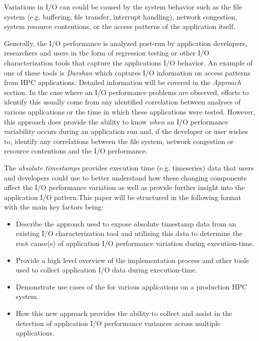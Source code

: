 \documentclass[conference]{IEEEtran}
\begin{document}
Variations in I/O can could be caused by the system behavior such as the file system (e.g. buffering, file transfer, interrupt handling), network congestion, system resource contentions, or the access patterns of the application itself.

Generally, the I/O performance is analyzed post-run by application developers, researchers and users in the form of regression testing or other I/O characterization tools that capture the applications I/O behavior. An example of one of these tools is \emph{Darshan} which captures I/O information on access patterns from HPC applications. Detailed information will be covered in the \emph{Approach} section. In the case where an I/O performance problems are observed, efforts to identify this usually come from any identified correlation between analyses of various applications or the time in which these applications were tested. However, this approach does provide the ability to know \emph{when} an I/O performance variability occurs during an application run and, if the developer or user wishes to, identify any correlations between the file system, network congestion or resource contentions and the I/O performance.


The \emph{absolute timestamps} provides execution time (e.g. timeseries) data that users and developers could use to better understand how these changing components affect the I/O performance variation as well as provide further insight into the application I/O pattern.This paper will be structured in the following format with the main key factors being:
\begin{itemize}
    \item Describe the approach used to expose absolute timestamp data from an existing I/O characterization tool and utilizing this data to determine the root cause(s) of application I/O performance variation during execution-time.
    \item Provide a high level overview of the implementation process and other tools used to collect application I/O data during execution-time.
    \item Demonstrate use cases of the \connector for various applications on a production HPC system. 
    \item How this new approach provides the ability to collect and assist in the detection of application I/O performance variances across multiple applications. 
\end{itemize}
\end{document}
